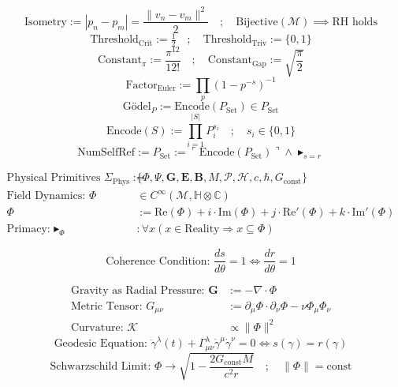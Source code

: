 \documentclass{article}
\newcommand{\AXIOM}{\blacktriangleright}
\newcommand{\DEF}{:=}
\newcommand{\IFF}{\Leftrightarrow}
\newcommand{\IMPLIES}{\Rightarrow}
\newcommand{\FORALL}{\forall}
\newcommand{\IN}{\in}
\newcommand{\SUBSET}{\subseteq}
\newcommand{\COLON}{:}
\newcommand{\COMPLEX}{\mathbb{C}}
\newcommand{\QUAT}{\mathbb{H}}
\newcommand{\MANIFOLD}{\mathcal{M}}
\newcommand{\ARC}{s}
\newcommand{\RADIUS}{r}
\newcommand{\PHASE}{\theta}
\newcommand{\PICONST}{\pi}
\newcommand{\DIV}{\nabla\cdot}
\newcommand{\META}[1]{\ulcorner #1 \urcorner}
\begin{document}
\[
\text{Isometry} \DEF |p_n - p_m| = \frac{\|v_n - v_m\|^2}{2} \quad ; \quad \text{Bijective}(\mathcal{M}) \implies \text{RH holds}
\]
\[
\text{Threshold}_{\text{Crit}} \DEF \tfrac{1}{2} \quad ; \quad \text{Threshold}_{\text{Triv}} \DEF \{0, 1\}
\]
\[
\text{Constant}_\pi \DEF \frac{\PICONST^{12}}{12!} \quad ; \quad \text{Constant}_{\text{Gap}} \DEF \sqrt{\frac{\PICONST}{2}}
\]
\[
\text{Factor}_{\text{Euler}} \DEF \prod_{p} (1 - p^{-s})^{-1}
\]
\[
\text{G\"odel}_P \DEF \text{Encode}(P_{\text{Set}}) \in P_{\text{Set}}
\]
\[
\text{Encode}(S) \DEF \prod_{i=1}^{|S|} P_i^{s_i} \quad ; \quad s_i \in \{0, 1\}
\]
\[
\text{NumSelfRef} \DEF P_{\text{Set}} \DEF \META{\text{Encode}(P_{\text{Set}})} \land \AXIOM_{s=r}
\]

\begin{align*}
\text{Physical Primitives } \Sigma_{\text{Phys}} \DEF & \{ \Phi, \Psi, \mathbf{G}, \mathbf{E}, \mathbf{B}, M, \mathcal{P}, \mathcal{H}, c, \hbar, G_{\text{const}} \} \\
\text{Field Dynamics: } \Phi & \IN C^\infty(\MANIFOLD, \QUAT \otimes \COMPLEX) \\
\Phi & \DEF \text{Re}(\Phi) + i \cdot \text{Im}(\Phi) + j \cdot \text{Re}'(\Phi) + k \cdot \text{Im}'(\Phi) \\
\text{Primacy: } \AXIOM_{\Phi} & \COLON \FORALL x \left( x \IN \text{Reality} \IMPLIES x \SUBSET \Phi \right)
\end{align*}

\[
\text{Coherence Condition: } \frac{d\ARC}{d\PHASE} = 1 \IFF \frac{d\RADIUS}{d\PHASE} = 1
\]

\begin{align*}
\text{Gravity as Radial Pressure: } \mathbf{G} & \DEF -\DIV \Phi \\
\text{Metric Tensor: } G_{\mu\nu} & \DEF \partial_\mu \Phi \cdot \partial_\nu \Phi - \nu \Phi_\mu \Phi_\nu \\
\text{Curvature: } \mathcal{K} & \propto \|\Phi\|^2
\end{align*}
\[
\text{Geodesic Equation: } \ddot{\gamma}^\lambda(t) + \Gamma^\lambda_{\mu\nu} \dot{\gamma}^\mu \dot{\gamma}^\nu = 0 \IFF \ARC(\gamma) = \RADIUS(\gamma)
\]
\[
\text{Schwarzschild Limit: } \Phi \to \sqrt{1 - \frac{2G_{\text{const}}M}{c^2 r}} \quad ; \quad \|\Phi\| = \text{const}
\]
\end{document}
